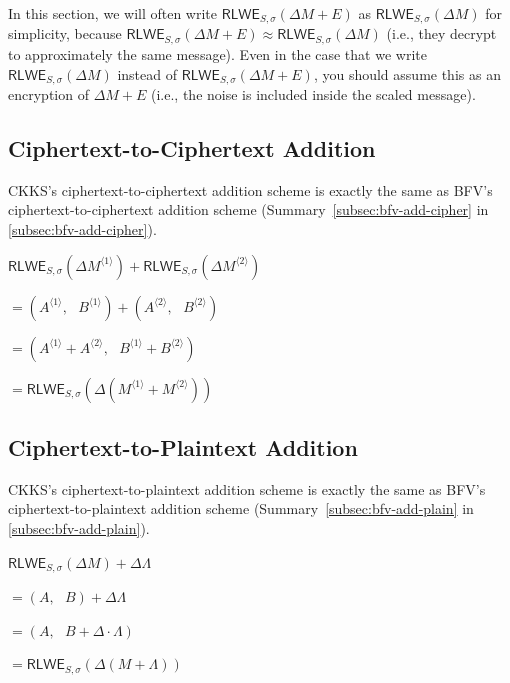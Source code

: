 In this section, we will often write $\textsf{RLWE}_{S,\sigma}(\Delta  M + E)$ as $\textsf{RLWE}_{S,\sigma}(\Delta  M)$ for simplicity, because $\textsf{RLWE}_{S,\sigma}(\Delta M + E) \approx \textsf{RLWE}_{S,\sigma}(\Delta M)$ (i.e., they decrypt to approximately the same message). Even in the case that we write $\textsf{RLWE}_{S,\sigma}(\Delta  M)$ instead of $\textsf{RLWE}_{S,\sigma}(\Delta  M + E)$, you should assume this as an encryption of $\Delta  M + E$ (i.e., the noise is included inside the scaled message).

\subsection{Ciphertext-to-Ciphertext Addition}
\label{subsec:ckks-add-cipher}

CKKS's ciphertext-to-ciphertext addition scheme is exactly the same as BFV's ciphertext-to-ciphertext addition scheme (Summary~\ref*{subsec:bfv-add-cipher} in \autoref{subsec:bfv-add-cipher}). 




\begin{tcolorbox}[title={\textbf{\tboxlabel{\ref*{subsec:ckks-add-cipher}} CKKS Ciphertext-to-Ciphertext Addition}}]
$\textsf{RLWE}_{S, \sigma}(\Delta M^{\langle 1 \rangle} ) + \textsf{RLWE}_{S, \sigma}(\Delta M^{\langle 2 \rangle} ) $

$ = ( A^{\langle 1 \rangle}, \text{ } B^{\langle 1 \rangle}) + (A^{\langle 2 \rangle}, \text{ } B^{\langle 2 \rangle}) $

$ = ( A^{\langle 1 \rangle} + A^{\langle 2 \rangle}, \text{ } B^{\langle 1 \rangle} + B^{\langle 2 \rangle} ) $

$= \textsf{RLWE}_{S, \sigma}(\Delta(M^{\langle 1 \rangle} + M^{\langle 2 \rangle}) )$
\end{tcolorbox}


\subsection{Ciphertext-to-Plaintext Addition}
\label{subsec:ckks-add-plain}

CKKS's ciphertext-to-plaintext addition scheme is exactly the same as BFV's ciphertext-to-plaintext addition scheme (Summary~\ref*{subsec:bfv-add-plain} in \autoref{subsec:bfv-add-plain}). 



\begin{tcolorbox}[title={\textbf{\tboxlabel{\ref*{subsec:ckks-add-plain}} CKKS Ciphertext-to-Plaintext Addition}}]
$\textsf{RLWE}_{S, \sigma}(\Delta M) + \Delta\Lambda $

$=  (A, \text{ } B) + \Delta\Lambda$

$=  (A, \text{ } B + \Delta\cdot\Lambda)$

$= \textsf{RLWE}_{S, \sigma}(\Delta (M + \Lambda) )$
\end{tcolorbox}




